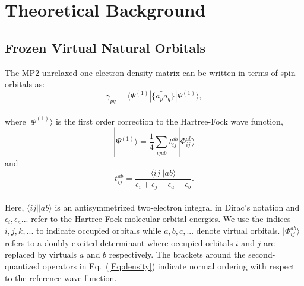 \section{Theoretical Background}

\subsection{Frozen Virtual Natural Orbitals}

The MP2 unrelaxed one-electron density matrix can be written in terms of
spin orbitals as: 
\\
\begin{equation}
\gamma_{pq} = \langle \Psi^{(1)}|\{ a^{\dagger}_{p}a_q\}|\Psi^{(1)}\rangle,
\label{Eq:density}
\end{equation}
\\
where $|\Psi^{(1)}\rangle$ is the first order correction to the Hartree-Fock
wave function,
\\
\begin{equation}
|\Psi^{(1)}\rangle = \frac{1}{4}\sum_{ijab} t^{ab}_{ij}|\Phi^{ab}_{ij}\rangle
\end{equation}
and
\begin{equation}
t^{ab}_{ij} = \frac{\langle ij||ab\rangle}{\epsilon_i + \epsilon_j -
\epsilon_a - \epsilon_b}.
\end{equation}
\\
Here, $\langle ij||ab\rangle$ is an antisymmetrized two-electron integral in
Dirac's notation and $\epsilon_i,\epsilon_a...$ refer to the Hartree-Fock
molecular orbital energies. We use the indices $i,j,k,...$ to indicate occupied
orbitals while $a,b,c,...$ denote virtual orbitals. $|\Phi^{ab}_{ij}\rangle$
refers to a doubly-excited determinant where occupied orbitals $i$ and $j$ are
replaced by virtuals $a$ and $b$ respectively.  The brackets around the
second-quantized operators in Eq.~(\ref{Eq:density}) indicate normal ordering
with respect to the reference wave function.

